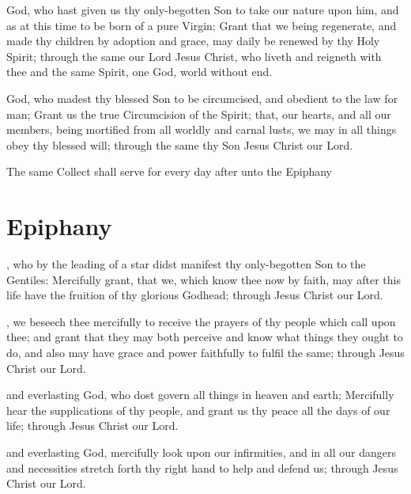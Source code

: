  God, who hast given us thy only-begotten Son to take our nature upon him, and as at this time to be born of a pure Virgin; Grant that we being regenerate, and made thy children by adoption and grace, may daily be renewed by thy Holy Spirit; through the same our Lord Jesus Christ, who liveth and reigneth with thee and the same Spirit, one God, world without end.

 God, who madest thy blessed Son to be circumcised, and obedient to the law for man; Grant us the true Circumcision of the Spirit; that, our hearts, and all our members, being mortified from all worldly and carnal lusts, we may in all things obey thy blessed will; through the same thy Son Jesus Christ our Lord.
\begin{secrubric}
The same Collect shall serve for every day after unto the Epiphany
\end{secrubric}

\section{Epiphany}

, who by the leading of a star didst manifest thy only-begotten Son to the Gentiles: Mercifully grant, that we, which know thee now by faith, may after this life have the fruition of thy glorious Godhead; through Jesus Christ our Lord.

, we beseech thee mercifully to receive the prayers of thy people which call upon thee; and grant that they may both perceive and know what things they ought to do, and also may have grace and power faithfully to fulfil the same; through Jesus Christ our Lord.

 and everlasting God, who dost govern all things in heaven and earth; Mercifully hear the supplications of thy people, and grant us thy peace all the days of our life; through Jesus Christ our Lord.

 and everlasting God, mercifully look upon our infirmities, and in all our dangers and necessities stretch forth thy right hand to help and defend us; through Jesus Christ our Lord.

